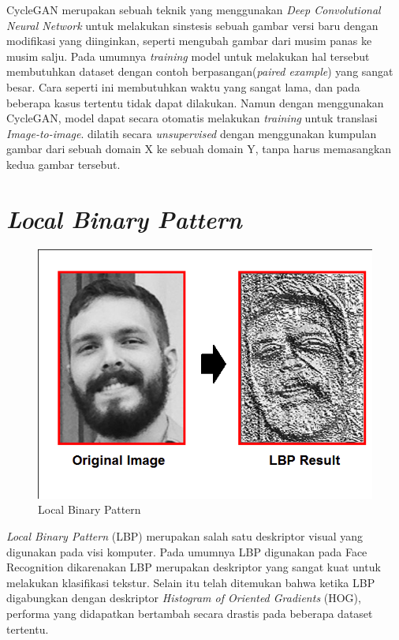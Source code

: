 CycleGAN merupakan sebuah teknik yang menggunakan \textit{Deep Convolutional Neural Network} untuk melakukan sinstesis sebuah gambar versi baru dengan modifikasi yang diinginkan, seperti mengubah gambar dari musim panas ke musim salju. Pada umumnya \textit{training} model untuk melakukan hal tersebut membutuhkan dataset dengan contoh berpasangan(\textit{paired example}) yang sangat besar. Cara seperti ini membutuhkan waktu yang sangat lama, dan pada beberapa kasus tertentu tidak dapat dilakukan. Namun dengan menggunakan CycleGAN, model dapat secara otomatis melakukan \textit{training} untuk translasi \textit{Image-to-image}.  dilatih secara \textit{unsupervised} dengan menggunakan kumpulan gambar dari sebuah domain X ke sebuah domain Y, tanpa harus memasangkan kedua gambar tersebut.

\section{\textit{Local Binary Pattern}}
\vspace{1ex}

\begin{figure}  [!htb]
	        \captionsetup{justification=centering}
	        \includegraphics[scale=0.2]{img/lbp.png}
        	\caption{Local Binary Pattern}
        	\label{fig: 3_27}
\end{figure}

\textit{Local Binary Pattern} (LBP) merupakan salah satu deskriptor visual yang digunakan pada visi komputer. Pada umumnya LBP digunakan pada Face Recognition dikarenakan LBP merupakan deskriptor yang sangat kuat untuk melakukan klasifikasi tekstur. Selain itu telah ditemukan bahwa ketika LBP digabungkan dengan deskriptor \textit{Histogram of Oriented Gradients} (HOG), performa yang didapatkan bertambah secara drastis pada beberapa dataset tertentu.

